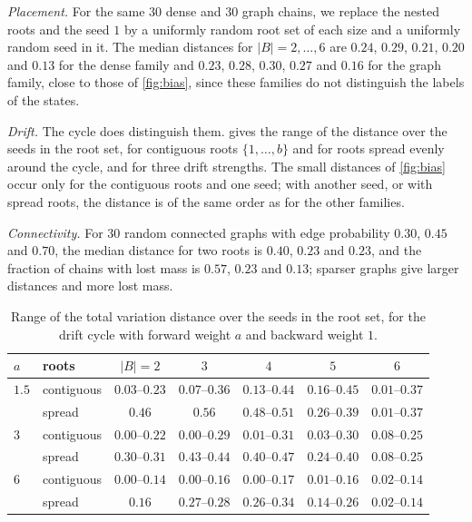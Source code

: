 \documentclass[onefignum,onetabnum,nohypdvips]{siamart250211}
\numberwithin{theorem}{section}
\numberwithin{equation}{section}
\begin{document}
\emph{Placement.} For the same $30$ dense and $30$ graph chains, we
replace the nested roots and the seed $1$ by a uniformly random root set
of each size and a uniformly random seed in it. The median distances for
$|B|=2,\dots,6$ are $0.24$, $0.29$, $0.21$, $0.20$ and $0.13$ for the
dense family and $0.23$, $0.28$, $0.30$, $0.27$ and $0.16$ for the graph
family, close to those of \cref{fig:bias}, since these families do not
distinguish the labels of the states.

\emph{Drift.} The cycle does
distinguish them.  gives the range of the distance over
the seeds in the root set, for contiguous roots $\{1,\dots,b\}$ and for
roots spread evenly around the cycle, and for three drift strengths.
The small distances of \cref{fig:bias} occur only for the contiguous
roots and one seed; with another seed, or with spread roots, the
distance is of the same order as for the other families.

\emph{Connectivity.} For $30$ random connected graphs with edge
probability $0.30$, $0.45$ and $0.70$, the median distance for two roots
is $0.40$, $0.23$ and $0.23$, and the fraction of chains with lost mass
is $0.57$, $0.23$ and $0.13$; sparser graphs give larger distances and
more lost mass.

\begin{table}[!htbp]
\caption{Range of the total variation distance over the seeds in the
root set, for the drift cycle with forward weight $a$ and backward
weight $1$.}\label{tab:drift}
\centering
\footnotesize
\begin{tabular}{@{}llccccc@{}}
\toprule
$a$ & roots & $|B|=2$ & $3$ & $4$ & $5$ & $6$\\
\midrule
$1.5$ & contiguous & $0.03$--$0.23$ & $0.07$--$0.36$ & $0.13$--$0.44$ & $0.16$--$0.45$ & $0.01$--$0.37$\\
 & spread & $0.46$ & $0.56$ & $0.48$--$0.51$ & $0.26$--$0.39$ & $0.01$--$0.37$\\
\addlinespace[2pt]
$3$ & contiguous & $0.00$--$0.22$ & $0.00$--$0.29$ & $0.01$--$0.31$ & $0.03$--$0.30$ & $0.08$--$0.25$\\
 & spread & $0.30$--$0.31$ & $0.43$--$0.44$ & $0.40$--$0.47$ & $0.24$--$0.40$ & $0.08$--$0.25$\\
\addlinespace[2pt]
$6$ & contiguous & $0.00$--$0.14$ & $0.00$--$0.16$ & $0.00$--$0.17$ & $0.01$--$0.16$ & $0.02$--$0.14$\\
 & spread & $0.16$ & $0.27$--$0.28$ & $0.26$--$0.34$ & $0.14$--$0.26$ & $0.02$--$0.14$\\
\bottomrule
\end{tabular}
\end{table}
\end{document}
